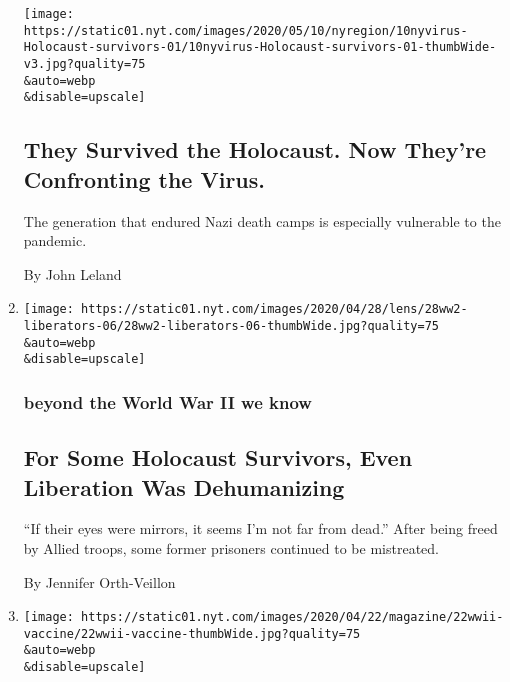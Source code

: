 \begin{enumerate}
  \texttt{[image: https://static01.nyt.com/images/2020/05/10/nyregion/10nyvirus-Holocaust-survivors-01/10nyvirus-Holocaust-survivors-01-thumbWide-v3.jpg?quality=75\\\&auto=webp\\\&disable=upscale]}

  \hypertarget{they-survived-the-holocaust-now-theyre-confronting-the-virus}{%
  \subsection{They Survived the Holocaust. Now They're Confronting the
  Virus.}\label{they-survived-the-holocaust-now-theyre-confronting-the-virus}}

  The generation that endured Nazi death camps is especially vulnerable
  to the pandemic.

  By John Leland
\item
  \href{/2020/04/28/magazine/for-some-holocaust-survivors-even-liberation-was-dehumanizing.html}{}

  \texttt{[image: https://static01.nyt.com/images/2020/04/28/lens/28ww2-liberators-06/28ww2-liberators-06-thumbWide.jpg?quality=75\\\&auto=webp\\\&disable=upscale]}

  \hypertarget{beyond-the-world-war-ii-we-know-11}{%
  \subsubsection{beyond the World War II we
  know}\label{beyond-the-world-war-ii-we-know-11}}

  \hypertarget{for-some-holocaust-survivors-even-liberation-was-dehumanizing}{%
  \subsection{For Some Holocaust Survivors, Even Liberation Was
  Dehumanizing}\label{for-some-holocaust-survivors-even-liberation-was-dehumanizing}}

  ``If their eyes were mirrors, it seems I'm not far from dead.'' After
  being freed by Allied troops, some former prisoners continued to be
  mistreated.

  By Jennifer Orth-Veillon
\item
  \href{/2020/04/23/magazine/army-influenza-vaccination.html}{}

  \texttt{[image: https://static01.nyt.com/images/2020/04/22/magazine/22wwii-vaccine/22wwii-vaccine-thumbWide.jpg?quality=75\\\&auto=webp\\\&disable=upscale]}

  \hypertarget{beyond-the-world-war-ii-we-know-12}{%
}
\end{enumerate}

